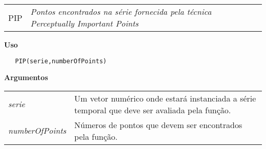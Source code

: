 
\hrulefill   

\begin{table}[!ht]
\begin{center}
\begin{tabularx}{\textwidth}{ X X}
\hspace{0.5cm} PIP & \textit{Pontos encontrados na série fornecida pela técnica Perceptually Important Points}\\
\end{tabularx}
\end{center}
\end{table} 

\vspace{-0.5cm}

\hrulefill  

\vspace{0.5cm}
  
\textbf{Uso}

\begin{lstlisting}
   PIP(serie,numberOfPoints)
\end{lstlisting}

\vspace{0.5cm}

\textbf{Argumentos}

\begin{table}[!ht]
\begin{center}
\begin{tabularx}{\textwidth}{X X}
\hspace{0.5cm} \textit{serie} \vspace{0.5cm}& Um vetor numérico onde estará instanciada a série temporal que deve ser avaliada pela função.\vspace{0.5cm}\\
\hspace{0.5cm} \textit{numberOfPoints} \vspace{0.5cm}& Números de pontos que devem ser encontrados pela função.\vspace{0.5cm}\\
\end{tabularx}
\end{center}
\end{table} 

\newpage

\hrulefill   

